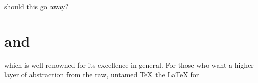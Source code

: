 

\textsf{should this go away?}
\section{\protect{\TeX} and \protect{\LaTeX}}
\label{sec:tex-and-latex}

which is well renowned for its excellence in general.  For those who
want a higher layer of abstraction from the raw, untamed {\TeX} the
{\LaTeX} 
for 


